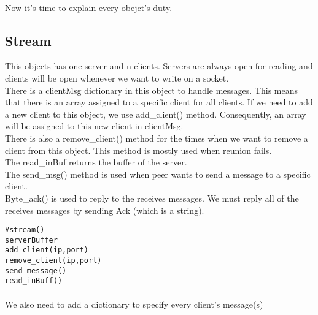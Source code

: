 \documentclass{article}
\begin{document}
\paragraph{}Now it's time to explain every obejct's duty.
\subsection{Stream}This objects has one server and n clients. Servers are always open for reading and clients will be open whenever we want to write on a socket. \\
There is a clientMsg dictionary in this object to handle messages. This means that there is an array assigned to a specific client for all clients. If we need to add a new client to this object, we use add\_client() method. Consequently, an array will be assigned to this new client in clientMsg.\\
There is also a remove\_client() method for the times when we want to remove a client from this object. This method is mostly used  when reunion fails.\\
The read\_inBuf returns the buffer of the server.\\
The send\_msg() method is used when peer wants to send a message to a specific client.\\
Byte\_ack() is used to reply to the receives messages. We must reply all of the receives messages by sending Ack (which is a string).\\
\begin{lstlisting}
#stream()
serverBuffer
add_client(ip,port)
remove_client(ip,port)
send_message()
read_inBuff()
\end{lstlisting}
\paragraph{}We also need to add a dictionary to specify every client's message(s)
\end{document}
